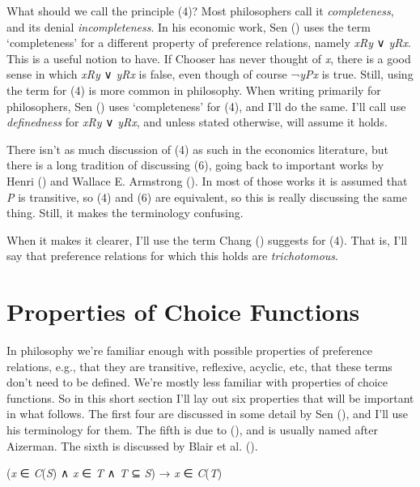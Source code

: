 \documentclass[
  11pt,
  letterpaper,
  DIV=11,
  numbers=noendperiod,
  twoside]{scrartcl}
\providecommand{\tightlist}{%
  \setlength{\itemsep}{0pt}\setlength{\parskip}{0pt}}
\begin{document}
What should we call the principle (4)? Most philosophers call it
\emph{completeness}, and its denial \emph{incompleteness}. In his
economic work, Sen () uses the
term `completeness' for a different property of preference relations,
namely \emph{xRy} ∨ \emph{yRx}. This is a useful notion to have. If
Chooser has never thought of \emph{x}, there is a good sense in which
\emph{xRy} ∨ \emph{yRx} is false, even though of course ¬\emph{yPx} is
true. Still, using the term for (4) is more common in philosophy. When
writing primarily for philosophers, Sen ()
uses `completeness' for (4), and I'll do the same. I'll call use
\emph{definedness} for \emph{xRy} ∨ \emph{yRx}, and unless stated
otherwise, will assume it holds.

There isn't as much discussion of (4) as such in the economics
literature, but there is a long tradition of discussing (6), going back
to important works by Henri
() and Wallace E.
Armstrong (). In most of those works
it is assumed that \emph{P} is transitive, so (4) and (6) are
equivalent, so this is really discussing the same thing. Still, it makes
the terminology confusing.

When it makes it clearer, I'll use the term Chang
() suggests for (4). That is, I'll say
that preference relations for which this holds are \emph{trichotomous}.

\section{Properties of Choice Functions}\label{sec-properties}

In philosophy we're familiar enough with possible properties of
preference relations, e.g., that they are transitive, reflexive,
acyclic, etc, that these terms don't need to be defined. We're mostly
less familiar with properties of choice functions. So in this short
section I'll lay out six properties that will be important in what
follows. The first four are discussed in some detail by Sen
(), and I'll use his
terminology for them. The fifth is due to
(), and is usually
named after Aizerman. The sixth is discussed by Blair et al.
().

\begin{description}
\tightlist
\item[Property α]
(\emph{x} ∈ \emph{C}(\emph{S}) ∧ \emph{x} ∈ \emph{T} ∧ \emph{T} ⊆
\emph{S}) → \emph{x} ∈ \emph{C}(\emph{T})
\end{description}
\end{document}
